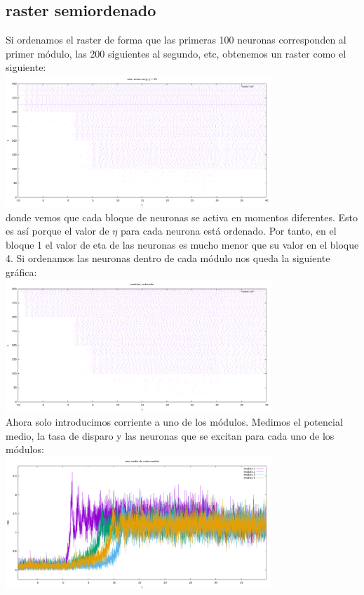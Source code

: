 \documentclass[a4paper]{article}
\begin{document}
\subsection{raster semiordenado}
Si ordenamos el raster de forma que las primeras 100 neuronas corresponden al primer módulo, las 200 siguientes al segundo, etc, obtenemos un raster como el siguiente:\\
\includegraphics[width=10cm,height=5cm]{modular_raster_J15_semiorden.pdf}\\
donde vemos que cada bloque de neuronas se activa en momentos diferentes. Esto es así porque el valor de $\eta$ para cada neurona está ordenado. Por tanto, en el bloque 1 el valor de eta de las neuronas es mucho menor que su valor en el bloque 4. Si ordenamos las neuronas dentro de cada módulo nos queda la siguiente gráfica:\\
\includegraphics[width=10cm,height=5cm]{modular_raster_J15_orden.pdf}\\
Ahora solo introducimos corriente a uno de los módulos. Medimos el potencial medio, la tasa de disparo y las neuronas que se excitan para cada uno de los módulos:\\
\includegraphics[width=10cm,height=5cm]{modular_rate_J15_separated.pdf}\\
\end{document}
